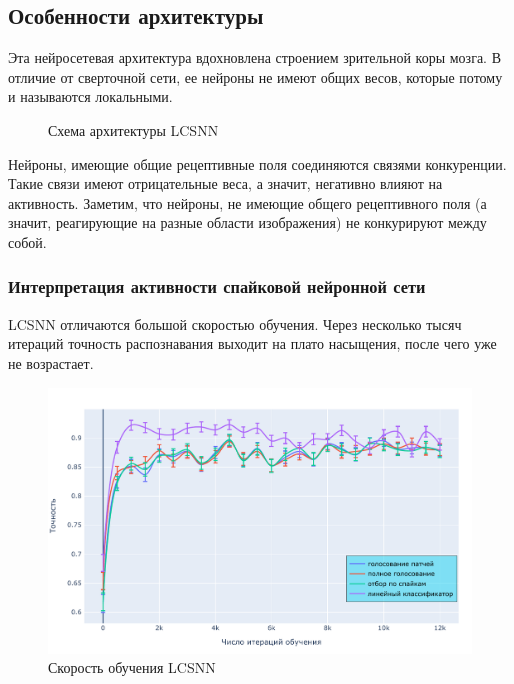 \documentclass[a4paper]{article}
\begin{document}
\subsection{Особенности архитектуры}
Эта нейросетевая архитектура вдохновлена строением зрительной коры мозга. В отличие от сверточной сети, ее нейроны не имеют общих весов, которые потому и называются локальными.

\begin{figure}[H]
    \centering
    \def\svgwidth{\columnwidth}
    
    \label{LCSNN}
    \caption{Схема архитектуры LCSNN}
\end{figure}


Нейроны, имеющие общие рецептивные поля соединяются связями конкуренции. Такие связи имеют отрицательные веса, а значит, негативно влияют на активность. Заметим, что нейроны, не имеющие общего рецептивного поля (а значит, реагирующие на разные области изображения) не конкурируют между собой.

\subsubsection{Интерпретация активности спайковой нейронной сети}

LCSNN отличаются большой скоростью обучения. Через несколько тысяч итераций точность распознавания выходит на плато насыщения, после чего уже не возрастает.

\begin{center}
\begin{figure}[H] 
 \includegraphics[width=\textwidth,keepaspectratio=true]{LCSNN_learning_rate_ru.pdf}
 \caption{Скорость обучения LCSNN}
\end{figure}
\end{center}
\end{document}
